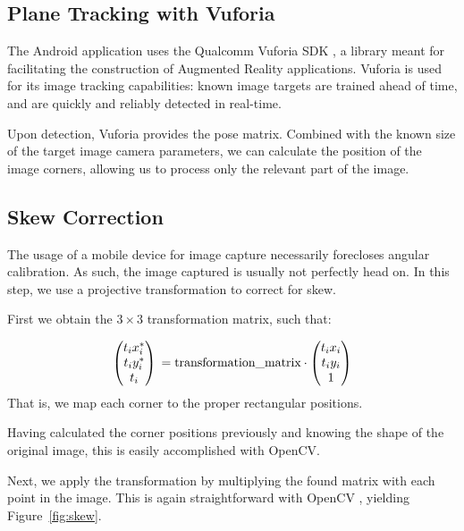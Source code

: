 \documentclass[11pt, letterpaper]{article}
\begin{document}
\subsection{Plane Tracking with Vuforia}
The Android application uses the Qualcomm Vuforia SDK \cite{vuforia}, a library meant for facilitating the construction of Augmented Reality applications.
Vuforia is used for its image tracking capabilities: known image targets are trained ahead of time, and are quickly and reliably detected in real-time.

Upon detection,	Vuforia provides the pose matrix. Combined with the known size of the target image camera parameters, we can calculate the position of the image corners, allowing us to process only the relevant part of the image.


\subsection{Skew Correction}
The usage of a mobile device for image capture necessarily forecloses angular calibration.
As such, the image captured is usually not perfectly head on.
In this step, we use a projective transformation to correct for skew.

First we obtain the $3 \times 3$ transformation matrix, such that:

$$
\begin{pmatrix}
t_i x_i^*\\
t_i y_i^*\\
t_i
\end{pmatrix}\\
= \text{transformation\_matrix} \cdot
\begin{pmatrix}
t_i x_i\\
t_i y_i\\
1
\end{pmatrix}
$$
That is, we map each corner to the proper rectangular positions.

Having calculated the corner positions previously and knowing the shape of the original image, this is easily accomplished with OpenCV\cite{opencv_getperspectivetransform}.

Next, we apply the transformation by multiplying the found matrix with each point in the image.
This is again straightforward with OpenCV \cite{opencv_warpperspective}, yielding Figure~\ref{fig:skew}.
\end{document}
